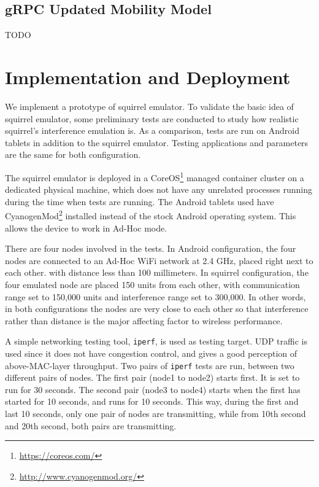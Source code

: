 \documentclass[12pt]{report}
\begin{document}
\subsection{gRPC Updated Mobility Model}

TODO

\section{Implementation and Deployment}

We implement a prototype of squirrel emulator. To validate the basic idea of squirrel emulator, some preliminary tests are conducted to study how realistic squirrel's interference emulation is. As a comparison, tests are run on Android tablets in addition to the squirrel emulator. Testing applications and parameters are the same for both configuration.

The squirrel emulator is deployed in a CoreOS\footnote{\url{https://coreos.com/}} managed container cluster on a dedicated physical machine, which does not have any unrelated processes running during the time when tests are running. The Android tablets used have CyanogenMod\footnote{\url{http://www.cyanogenmod.org/}} installed instead of the stock Android operating system. This allows the device to work in Ad-Hoc mode.

There are four nodes involved in the tests. In Android configuration, the four nodes are connected to an Ad-Hoc WiFi network at 2.4 GHz, placed right next to each other. with distance less than 100 millimeters. In squirrel configuration, the four emulated node are placed 150 units from each other, with communication range set to 150,000 units and interference range set to 300,000. In other words, in both configurations the nodes are very close to each other so that interference rather than distance is the major affecting factor to wireless performance.

A simple networking testing tool, \texttt{iperf}, is used as testing target. UDP traffic is used since it does not have congestion control, and gives a good perception of above-MAC-layer throughput. Two pairs of \texttt{iperf} tests are run, between two different pairs of nodes. The first pair (node1 to node2) starts first. It is set to run for 30 seconds. The second pair (node3 to node4) starts when the first has started for 10 seconds, and runs for 10 seconds. This way, during the first and last 10 seconds, only one pair of nodes are transmitting, while from 10th second and 20th second, both pairs are transmitting.
\end{document}
